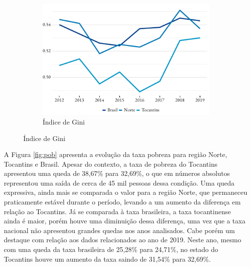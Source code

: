 \begin{figure}[!h]
\begin{subfigure}{\linewidth}
	\end{subfigure}
	\begin{subfigure}{\linewidth}
		\caption{Índice de Gini}
		\label{fig:gini}
		\includegraphics{fig/gini.pdf}
	\end{subfigure}
\end{figure}
\par A Figura \ref{fig:pob} apresenta a evolução da taxa pobreza para região Norte, Tocantins e Brasil. Apesar do contexto, a taxa de pobreza do Tocantins apresentou uma queda de 38,67\% para 32,69\%, o que em números absolutos representou uma saída de cerca de 45 mil pessoas dessa condição. Uma queda expressiva, ainda mais se comparada o valor para a região Norte, que permaneceu praticamente estável durante o período, levando a um aumento da diferença em relação ao Tocantins. Já se comparada à taxa brasileira, a taxa tocantinense ainda é maior, porém houve uma diminuição dessa diferença, uma vez que a taxa nacional não apresentou grandes quedas nos anos analisados. Cabe porém um destaque com relação aos dados relacionados ao ano de 2019. Neste ano, mesmo com uma queda da taxa brasileira de 25,28\% para 24,71\%, no estado do Tocantins houve um aumento da taxa saindo de 31,54\% para 32,69\%.

